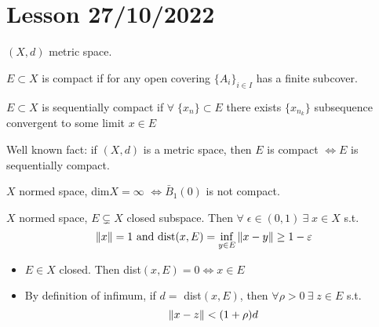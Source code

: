 \section{Lesson 27/10/2022}

\(\left(X, d\right)\) metric space.
\begin{definition}
    \(E \subset X\) is compact if for any open covering \(\{A_i\}_{i \in I}\) has a finite subcover.
\end{definition}

\begin{definition}
    \(E \subset X\) is sequentially compact if \(\forall \; \{x_n\} \subset E \) 
    there exists \(\{x_{n_k}\}\) subsequence convergent to some limit \(x \in E\)
\end{definition}

Well known fact: if \(\left(X, d\right)\) is a metric space, then \(E\) is compact \(\Leftrightarrow E \) is sequentially compact.

\begin{theorem}
    \(X\) normed space, dim\(X = \infty\) \(\Leftrightarrow \bar{B}_1(0)\) is not compact. 
\end{theorem}

\begin{lemma}
    \(X\) normed space, \(E \subsetneq X\) closed subspace. Then \(\forall \; \epsilon \in \left(0, 1\right) \ \exists \; x \in X \) s.t. 
    \[
        \norm{x}=1 \text{ and } \text{dist}(x, E) = \inf_{y \in E} \norm{x-y} \geq 1- \varepsilon\]
\end{lemma}

\begin{remark}

    \begin{itemize}
        \item \(E \in X\) closed. Then dist\((x, E)=0 \Leftrightarrow x \in E\)
        \item By definition of infimum, if \(d =\) dist\((x, E)\), then \(\forall \rho >0 \ \exists \; z \in E\) s.t. 
        \[
            \norm{x-z} < (1+\rho) d
        \]
    \end{itemize}
\end{remark}

